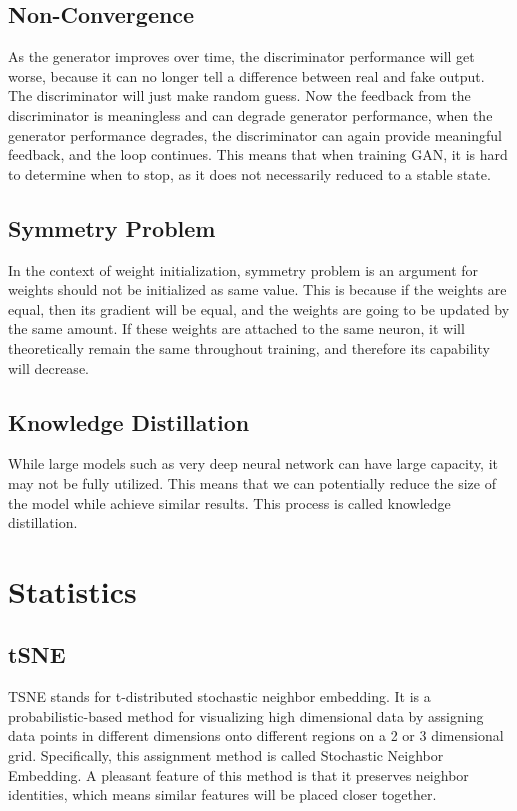 \section{Non-Convergence}
\label{app:ml:non_conv}
As the generator improves over time, the discriminator performance will get worse, because it can no longer tell a difference between real and fake output. The discriminator will just make random guess. Now the feedback from the discriminator is meaningless and can degrade generator performance, when the generator performance degrades, the discriminator can again provide meaningful feedback, and the loop continues. This means that when training GAN, it is hard to determine when to stop, as it does not necessarily reduced to a stable state.

\section{Symmetry Problem}
\label{app:ml:sym}
In the context of weight initialization, symmetry problem is an argument for weights should not be initialized as same value. This is because if the weights are equal, then its gradient will be equal, and the weights are going to be updated by the same amount. If these weights are attached to the same neuron, it will theoretically remain the same throughout training, and therefore its capability will decrease.

\section{Knowledge Distillation}
\label{app:ml:kd}
While large models such as very deep neural network can have large capacity, it may not be fully utilized. This means that we can potentially reduce the size of the model while achieve similar results. This process is called knowledge distillation.

\chapter{Statistics}
\label{app:stat}

\section{tSNE}
\label{app:stat:tsne}
TSNE stands for t-distributed stochastic neighbor embedding. It is a probabilistic-based method for visualizing high dimensional data by assigning data points in different dimensions onto different regions on a 2 or 3 dimensional grid. Specifically, this assignment method is called Stochastic Neighbor Embedding\cite{hintonStochasticNeighborEmbedding2002}. A pleasant feature of this method is that it preserves neighbor identities, which means similar features will be placed closer together.

